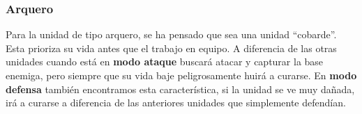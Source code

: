 \subsubsection{Arquero}

Para la unidad de tipo arquero, se ha pensado que sea una unidad ``cobarde''. Esta prioriza su vida antes que el trabajo en equipo. A diferencia de las otras unidades cuando está en \textbf{modo ataque} buscará atacar y capturar la base enemiga, pero siempre que su vida baje peligrosamente huirá a curarse. En \textbf{modo defensa} también encontramos esta característica, si la unidad se ve muy dañada, irá a curarse a diferencia de las anteriores unidades que simplemente defendían.

\begin{figure}[H]
    \centering
\end{figure}
